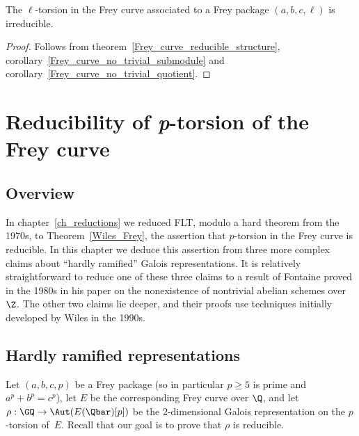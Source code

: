 \begin{theorem}\label{Frey_curve_irreducible} The $\ell$-torsion in the Frey curve associated to a Frey package $(a,b,c,\ell)$ is irreducible.
\end{theorem}
\begin{proof} Follows from theorem~\ref{Frey_curve_reducible_structure}, corollary~\ref{Frey_curve_no_trivial_submodule}
  and corollary~\ref{Frey_curve_no_trivial_quotient}.
\end{proof}


\chapter{Reducibility of {\it p}-torsion of the Frey curve}\label{ch_freyreduction}

\section{Overview}

In chapter~\ref{ch_reductions} we reduced FLT, modulo a hard theorem from the 1970s,
to Theorem~\ref{Wiles_Frey}, the assertion that $p$-torsion in the Frey
curve is reducible. In this chapter we deduce this assertion from three more complex claims
about ``hardly ramified'' Galois representations. It is relatively straightforward
to reduce one of these three claims to a result of Fontaine proved in the 1980s in his
paper on the nonexistence of nontrivial abelian schemes over $\Z$. The other two
claims lie deeper, and their proofs use techniques initially developed by Wiles in
the 1990s.

\section{Hardly ramified representations}

Let $(a,b,c,p)$ be a Frey package (so in particular $p\geq5$ is prime and $a^p+b^p=c^p$),
let $E$ be the corresponding Frey curve over $\Q$, and let $\rho:\GQ\to\Aut(E(\Qbar)[p])$
be the 2-dimensional Galois representation on the $p$-torsion of~$E$. Recall that our goal
is to prove that $\rho$ is reducible.

